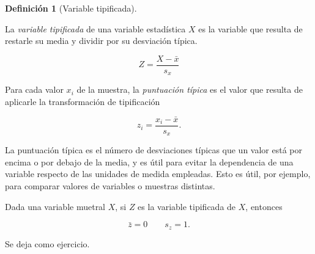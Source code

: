 \documentclass[
  spanish,
  a4paper,
]{scrreport}
\theoremstyle{plain}
\theoremstyle{definition}
\theoremstyle{definition}
\newtheorem{definition}{Definición}[chapter]
\theoremstyle{remark}
\begin{document}
\begin{definition}[Variable
tipificada]\protect\hypertarget{def-variable-tipificada}{}\label{def-variable-tipificada}

La \emph{variable tipificada} de una variable estadística \(X\) es la
variable que resulta de restarle su media y dividir por su desviación
típica.

\[Z=\frac{X-\bar x}{s_{x}}\]

Para cada valor \(x_i\) de la muestra, la \emph{puntuación típica} es el
valor que resulta de aplicarle la transformación de tipificación

\[z_i=\frac{x_i-\bar x}{s_{x}}.\]

\end{definition}

\begin{tcolorbox}[enhanced jigsaw, arc=.35mm, bottomrule=.15mm, bottomtitle=1mm, breakable, colback=white, colbacktitle=quarto-callout-tip-color!10!white, colframe=quarto-callout-tip-color-frame, coltitle=black, left=2mm, leftrule=.75mm, opacityback=0, opacitybacktitle=0.6, rightrule=.15mm, title=\textcolor{quarto-callout-tip-color}{\faLightbulb}\hspace{0.5em}{Tip}, titlerule=0mm, toprule=.15mm, toptitle=1mm]

La puntuación típica es el número de desviaciones típicas que un valor
está por encima o por debajo de la media, y es útil para evitar la
dependencia de una variable respecto de las unidades de medida
empleadas. Esto es útil, por ejemplo, para comparar valores de variables
o muestras distintas.

\end{tcolorbox}

Dada una variable muetral \(X\), si \(Z\) es la variable tipificada de
\(X\), entonces

\[\bar z = 0 \qquad s_{z} = 1.\]

\begin{tcolorbox}[enhanced jigsaw, arc=.35mm, bottomrule=.15mm, bottomtitle=1mm, breakable, colback=white, colbacktitle=quarto-callout-note-color!10!white, colframe=quarto-callout-note-color-frame, coltitle=black, left=2mm, leftrule=.75mm, opacityback=0, opacitybacktitle=0.6, rightrule=.15mm, title=\textcolor{quarto-callout-note-color}{\faInfo}\hspace{0.5em}{Demostración}, titlerule=0mm, toprule=.15mm, toptitle=1mm]

Se deja como ejercicio.

\end{tcolorbox}
\end{document}

